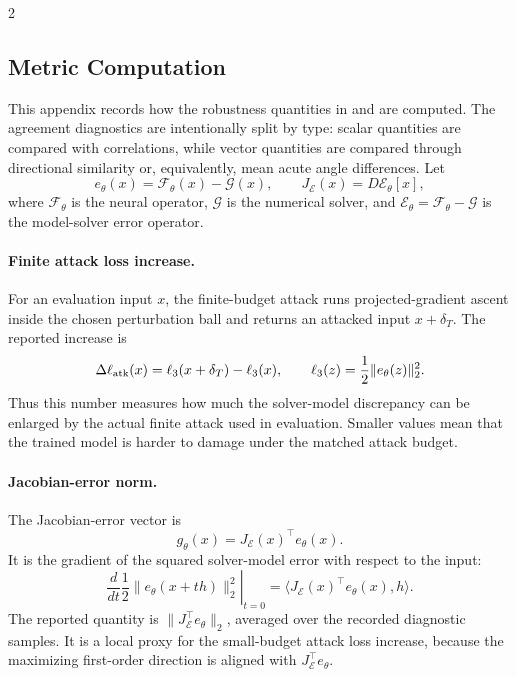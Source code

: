 \clearpage
{}
\begin{multicols}{2}

\subsection*{Metric Computation}

This appendix records how the robustness quantities in
 and
 are computed.  The agreement
diagnostics are intentionally split by type: scalar quantities are compared
with correlations, while vector quantities are compared through directional
similarity or, equivalently, mean acute angle differences.  Let
\[
  e_\theta(x)=\mathcal{F}_\theta(x)-\mathcal{G}(x),
  \qquad
  J_{\mathcal E}(x)=D\mathcal{E}_\theta[x],
\]
where \(\mathcal{F}_\theta\) is the neural operator, \(\mathcal{G}\) is the
numerical solver, and \(\mathcal{E}_\theta=\mathcal{F}_\theta-\mathcal{G}\) is
the model-solver error operator.

\paragraph{Finite attack loss increase.}
For an evaluation input \(x\), the finite-budget attack runs projected-gradient
ascent inside the chosen perturbation ball and returns an attacked input
\(x+\delta_T\).  The reported increase is
\[
  \Delta\ell_{\rm atk}(x)
  =
  \ell_3(x+\delta_T)-\ell_3(x),
  \qquad
  \ell_3(z)=\frac{1}{2}\|e_\theta(z)\|_2^2 .
\]
Thus this number measures how much the solver-model discrepancy can be enlarged
by the actual finite attack used in evaluation.  Smaller values mean that the
trained model is harder to damage under the matched attack budget.

\paragraph{Jacobian-error norm.}
The Jacobian-error vector is
\[
  g_\theta(x)=J_{\mathcal E}(x)^\top e_\theta(x).
\]
It is the gradient of the squared solver-model error with respect to the input:
\[
  \left.\frac{d}{dt}\frac{1}{2}
  \|e_\theta(x+t h)\|_2^2\right|_{t=0}
  =
  \langle J_{\mathcal E}(x)^\top e_\theta(x),h\rangle .
\]
The reported quantity is \(\|J_{\mathcal E}^{\top}e_\theta\|_2\), averaged over
the recorded diagnostic samples.  It is a local proxy for the small-budget
attack loss increase, because the maximizing first-order direction is aligned
with \(J_{\mathcal E}^{\top}e_\theta\).


\end{multicols}
